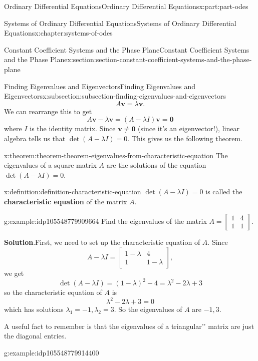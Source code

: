 \documentclass[oneside,10pt,]{book}
\newcommand{\blocktitlefont}{\relax}
\newcommand{\terminology}[1]{\textbf{#1}}
\numberwithin{equation}{part}
\renewcommand{\vec}[1]{\mathbf{#1}}
\newcommand{\amp}{&}
\begin{document}
\begin{partptx}{Ordinary Differential Equations}{}{Ordinary Differential Equations}{}{}{x:part:part-odes}
\begin{chapterptx}{Systems of Ordinary Differential Equations}{}{Systems of Ordinary Differential Equations}{}{}{x:chapter:systems-of-odes}
\begin{sectionptx}{Constant Coefficient Systems and the Phase Plane}{}{Constant Coefficient Systems and the Phase Plane}{}{}{x:section:section-constant-coefficient-systems-and-the-phase-plane}
\begin{subsectionptx}{Finding Eigenvalues and Eigenvectors}{}{Finding Eigenvalues and Eigenvectors}{}{}{x:subsection:subsection-finding-eigenvalues-and-eigenvectors}
\begin{equation*}
A\vec{v} = \lambda\vec{v}.
\end{equation*}
We can rearrange this to get%
\begin{equation*}
A\vec{v}-\lambda\vec{v} = (A-\lambda I)\vec{v} = \vec{0}
\end{equation*}
where \(I\) is the identity matrix. Since \(\vec{v}\neq\vec{0}\) (since it's an eigenvector!), linear algebra tells us that \(\det(A-\lambda I) = 0\). This gives us the following theorem.%
\begin{theorem}{}{}{x:theorem:theorem-theorem-eigenvalues-from-characteristic-equation}%
The eigenvalues of a square matrix \(A\) are the solutions of the equation \(\det(A-\lambda I) = 0\).%
\end{theorem}
\begin{definition}{}{x:definition:definition-characteristic-equation}%
\(\det(A-\lambda I)=0\) is called the \terminology{characteristic equation} of the matrix \(A\).%
\end{definition}
\begin{example}{}{g:example:idp105548779909664}%
Find the eigenvalues of the matrix \(A = \begin{bmatrix}1\amp 4\\1\amp 1\end{bmatrix}\).%
\par\smallskip%
\noindent\textbf{\blocktitlefont Solution}.\hypertarget{g:solution:idp105548779910560}{}\quad{}First, we need to set up the characteristic equation of \(A\). Since%
\begin{equation*}
A-\lambda I = \begin{bmatrix}1-\lambda \amp  4 \\ 1 \amp  1-\lambda\end{bmatrix},
\end{equation*}
we get%
\begin{equation*}
\det(A-\lambda I) = (1-\lambda)^{2} - 4 = \lambda^{2}-2\lambda+3
\end{equation*}
so the characteristic equation of \(A\) is%
\begin{equation*}
\lambda^{2}-2\lambda+3 = 0
\end{equation*}
which has solutions \(\lambda_{1} = -1,\lambda_{2} = 3\). So the eigenvalues of \(A\) are \(-1,3\).%
\end{example}
A useful fact to remember is that the eigenvalues of a \textasciigrave{}\textasciigrave{}triangular'{}'{} matrix are just the diagonal entries.%
\begin{example}{}{g:example:idp105548779914400}%

\end{example}
\end{subsectionptx}
\end{sectionptx}
\end{chapterptx}
\end{partptx}
\end{document}
